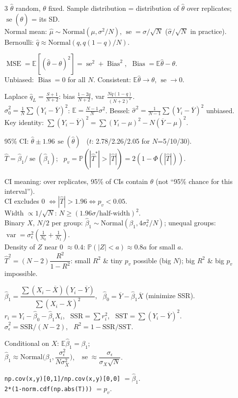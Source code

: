 \documentclass[11pt]{article}
\newcommand{\E}{\mathbb{E}}
\newcommand{\Var}{\operatorname{var}}
\newcommand{\se}{\operatorname{se}}
\newcommand{\MSE}{\operatorname{MSE}}
\newcommand{\Bias}{\operatorname{Bias}}
\renewcommand{\P}{\mathbb{P}}
\newcommand{\Norm}{\text{Normal}}
\newcommand{\SSR}{\mathrm{SSR}}
\newcommand{\SST}{\mathrm{SST}}
\newcommand{\py}[1]{\texttt{#1}}
\newcommand{\Ybar}{\overline{Y}}
\newcommand{\Xbar}{\overline{X}}
\begin{document}
\begin{landscape}
\begin{multicols}{3}
$\hat\theta$ random, $\theta$ fixed. Sample distribution = distribution of $\hat\theta$ over replicates; $\se(\hat\theta)$ = its SD.\\
Normal mean: $\hat\mu\sim\Norm(\mu,\sigma^2/N)$, $\se=\sigma/\sqrt N$ ($\hat\sigma/\sqrt N$ in practice).\\
Bernoulli: $\hat q\approx\Norm(q,q(1-q)/N)$.
\begin{cbox}
$\MSE=\E[(\hat\theta-\theta)^2]=\se^2+\Bias^2$, $\ \Bias=\E\hat\theta-\theta$.\\
Unbiased: $\Bias=0$ for all $N$. Consistent: $\E\hat\theta\to\theta$, $\se\to0$.
\end{cbox}
Laplace $\hat q_L=\frac{S+1}{N+2}$: bias $\frac{1-2q}{N+2}$, var $\frac{Nq(1-q)}{(N+2)^2}$.\\
$\hat\sigma_0^2=\frac1N\sum(Y_i-\Ybar)^2$: $\E=\frac{N-1}N\sigma^2$. Bessel: $\hat\sigma^2=\frac1{N-1}\sum(Y_i-\Ybar)^2$ unbiased.\\
Key identity: $\sum(Y_i-\Ybar)^2=\sum(Y_i-\mu)^2-N(\Ybar-\mu)^2$.

\columnbreak

\begin{cbox}
95\% CI: $\hat\theta\pm1.96\,\se(\hat\theta)$ \ ($t$: 2.78/2.26/2.05 for $N$=5/10/30).\\
$\hat T=\hat\beta_1/\se(\hat\beta_1)$; \ $p_v=\P(|\hat T^*|>|\hat T|)=2(1-\Phi(|\hat T|))$.
\end{cbox}
CI meaning: over replicates, 95\% of CIs contain $\theta$ (not ``95\% chance for this interval'').\\
CI excludes 0 $\iff|\hat T|>1.96\iff p_v<0.05$.\\
Width $\propto1/\sqrt N$: $N\ge(1.96\sigma/\text{half-width})^2$.\\
Binary $X$, $N/2$ per group: $\hat\beta_1\sim\Norm(\beta_1,4\sigma_\epsilon^2/N)$; unequal groups: $\Var=\sigma_\epsilon^2(\frac1{N_0}+\frac1{N_1})$.\\
Density of $Z$ near 0 $\approx0.4$: $\P(|Z|<a)\approx0.8a$ for small $a$.\\
$\hat T^2=(N-2)\dfrac{R^2}{1-R^2}$: small $R^2$ \& tiny $p_v$ possible (big $N$); big $R^2$ \& big $p_v$ impossible.

$\hat\beta_1=\dfrac{\sum(X_i-\Xbar)(Y_i-\Ybar)}{\sum(X_i-\Xbar)^2}$, \ $\hat\beta_0=\Ybar-\hat\beta_1\Xbar$ (minimize SSR).\\
$r_i=Y_i-\hat\beta_0-\hat\beta_1X_i$, \ $\SSR=\sum r_i^2$, \ $\SST=\sum(Y_i-\Ybar)^2$.\\
$\hat\sigma_\epsilon^2=\SSR/(N-2)$, \ $R^2=1-\SSR/\SST$.
\begin{cbox}
Conditional on $X$: $\E\hat\beta_1=\beta_1$;\\
$\hat\beta_1\approx\Norm\!\Big(\beta_1,\dfrac{\sigma_\epsilon^2}{N\sigma_X^2}\Big)$, \ $\se\approx\dfrac{\sigma_\epsilon}{\sigma_X\sqrt N}$.
\end{cbox}
\py{np.cov(x,y)[0,1]/np.cov(x,y)[0,0]} $=\hat\beta_1$.\\
\py{2*(1-norm.cdf(np.abs(T)))} $=p_v$.


\end{multicols}
\end{landscape}
\end{document}
